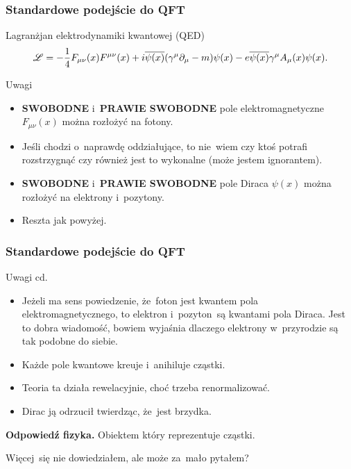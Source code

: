 \documentclass[10pt,t]{beamer}
\begin{document}
\begin{frame}
  \frametitle{Standardowe podejście do QFT}


  Lagranżjan elektrodynamiki kwantowej (QED)
  \begin{equation}
    \label{eq:O-roznych-01}
    \mathcal{L} =
    -\frac{ 1 }{ 4 } F_{ \mu \nu }( x ) F^{ \mu \nu }( x )
    + i \overline{\psi( x )} ( \gamma^{ \mu } \partial_{ \mu } - m ) \psi( x )
    - e \overline{\psi( x )} \gamma^{ \mu } A_{ \mu }( x ) \psi( x ).
  \end{equation}

  Uwagi
  \begin{itemize}

  \item \textbf{SWOBODNE} i~\textbf{PRAWIE SWOBODNE} pole
    elektromagnetyczne $F_{ \mu \nu }( x )$ można rozłożyć na fotony.

  \item Jeśli chodzi o~naprawdę oddziałujące, to nie~wiem czy ktoś potrafi
    rozstrzygnąć czy również jest to wykonalne (może jestem ignorantem).

  \item \textbf{SWOBODNE} i~\textbf{PRAWIE SWOBODNE} pole Diraca $\psi( x )$
    można rozłożyć na elektrony i~pozytony.

  \item Reszta jak powyżej.

  \end{itemize}

\end{frame}





\begin{frame}
  \frametitle{Standardowe podejście do QFT}


  Uwagi cd.
  \begin{itemize}
    \RaggedRight

  \item Jeżeli ma sens powiedzenie, że~foton jest kwantem pola
    elektromagnetycznego, to elektron i~pozyton~są kwantami pola
    Diraca. Jest to dobra wiadomość, bowiem wyjaśnia dlaczego
    elektrony w~przyrodzie są tak podobne do siebie.

  \item Każde pole kwantowe kreuje i~anihiluje cząstki.

  \item Teoria ta działa rewelacyjnie, choć trzeba renormalizować.

  \item Dirac ją odrzucił twierdząc, że~jest brzydka.

  \end{itemize}



  \textbf{Odpowiedź fizyka.} Obiektem który reprezentuje cząstki.

  Więcej~się nie dowiedziałem, ale może za~mało pytałem?

\end{frame}
\end{document}
